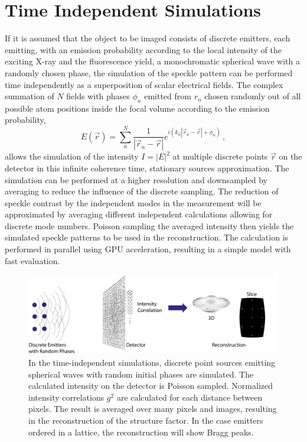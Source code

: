 \section{Time Independent Simulations}
If it is assumed that the object to be imaged consists of discrete emitters, each emitting, with an emission probability according to the local intensity of the exciting X-ray and the fluorescence yield, a monochromatic spherical wave with a randomly chosen phase, the simulation of the speckle pattern can be performed time independently as a superposition of scalar electrical fields.
The complex summation of $N$ fields with phases $\phi_n$  emitted from $r_n$ chosen randomly out of all possible atom positions inside the focal volume according to the emission probability,
\begin{equation}
	E(\vec{r})=\sum_n^N \frac{1}{\left|\vec{r}_n-\vec{r}\right|} e^{i(k_n{\left|\vec{r}_n-\vec{r}\right|}+\phi_n)} \,,
\end{equation}
allows the simulation of the intensity $I=\left|E\right|^2$ at multiple discrete points $\vec{r}$ on the detector in this infinite coherence time, stationary sources approximation.  The simulation can be performed at a higher resolution and downsampled by averaging to reduce the influence of the discrete sampling. The reduction of speckle contrast by the independent modes in the measurement will be approximated by averaging different independent calculations allowing for discrete mode numbers. Poisson sampling the averaged intensity then yields the simulated speckle patterns to be used in the reconstruction. 
The calculation is performed in parallel using GPU acceleration, resulting in a simple model with fast evaluation.
\begin{figure}
	\centering
	\includegraphics[width=0.7\linewidth]{images/sim.pdf}
	\caption[Setup of the Simulation]{In the time-independent simulations, discrete point sources emitting spherical waves with random initial phases are simulated. The calculated intensity on the detector is Poisson sampled. Normalized intensity correlations $g^2$ are calculated for each distance between pixels. The result is averaged over many pixels and images, resulting in the reconstruction of the structure factor. In the case emitters ordered in a lattice, the reconstruction will show Bragg peaks.}
\end{figure}


